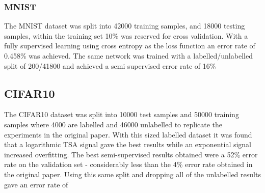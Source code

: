 \documentclass[a4paper]{article}
\begin{document}
\subsubsection{MNIST}
The MNIST dataset was split into 42000 training samples, and 18000 testing samples, within the training set 10\% was reserved for cross validation. With a fully supervised learning using cross entropy as the loss function an error rate of 0.458\% was achieved. The same network was trained with a labelled/unlabelled split of 200/41800 and achieved a semi supervised error rate of 16\%

\subsection{CIFAR10}
The CIFAR10 dataset was split into 10000 test samples and 50000 training samples where 4000 are labelled and 46000 unlabelled to replicate the experiments in the original paper. 
With this sized labelled dataset it was found that a logarithmic TSA signal gave the best results while an exponential signal increased overfitting. The best semi-supervised results obtained were a 52\% error rate on the validation set - considerably less than the 4\% error rate obtained in the original paper. Using this same split and dropping all of the unlabelled results gave an error rate of 
\end{document}
